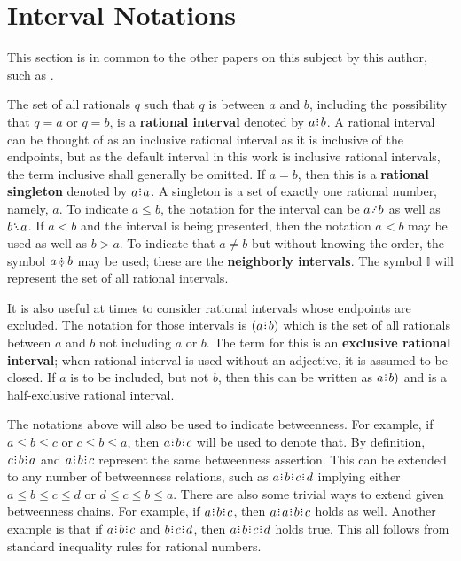 \documentclass[12pt]{article}
\begin{document}
\section{Interval Notations}

This section is in common to the other papers on this subject by this author, such as \cite{taylor24dedekind}.

The set of all rationals $q$ such that $q$ is between $a$ and $b$, including the possibility that $q=a$ or $q=b$, is a \textbf{rational interval} denoted by $a\rint b$. A rational interval can be thought of as an inclusive rational interval as it is inclusive of the endpoints, but as the default interval in this work is inclusive rational intervals, the term inclusive shall generally be omitted.  If $a=b$, then this is a \textbf{rational singleton} denoted by $a\rint a$. A singleton is a set of exactly one rational number, namely, $a$. To indicate $a \leq b$, the notation for the interval can be $a \lte b$ as well as $b \gte a$. If $a < b$ and the interval is being presented, then the notation $a \lt b$ may be used as well as $b \gt a$. To indicate that $a \neq b$ but without knowing the order, the symbol $a \betneq b$ may be used; these are the \textbf{neighborly intervals}. The symbol $\mathbb{I}$ will represent the set of all rational intervals. 

It is also useful at times to consider rational intervals whose endpoints are excluded. The notation for those intervals is $(a \rint b)$ which is the set of all rationals between $a$ and $b$ not including $a$ or $b$. The term for this is an \textbf{exclusive rational interval}; when rational interval is used without an adjective, it is assumed to be closed. If $a$ is to be included, but not $b$, then this can be written as $a\rint b)$ and is a half-exclusive rational interval. 

The notations above will also be used to indicate betweenness. For example, if $a \leq b \leq c$ or $c \leq b \leq a$, then $a\rint b\rint c$ will be used to denote that. By definition, $c\rint b\rint a$ and $a\rint b\rint c$ represent the same betweenness assertion. This can be extended to any number of betweenness relations, such as $a\rint b\rint c\rint d$ implying either $a \leq b \leq c \leq d$ or $d \leq c \leq b \leq a$. There are also some trivial ways to extend given betweenness chains. For example, if $a\rint b\rint c$, then $a\rint a\rint b\rint c$ holds as well. Another example is that if $a\rint b\rint c$ and $b\rint c\rint d$, then $a\rint b\rint c\rint d$ holds true. This all follows from standard inequality rules for rational numbers. 
\end{document}
